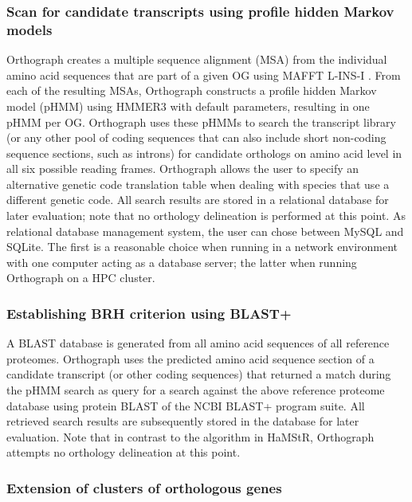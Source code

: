 \subsubsection{Scan for candidate transcripts using profile hidden
Markov
models}

Orthograph creates a multiple sequence alignment (MSA) from the
individual amino acid sequences that are part of a given OG using MAFFT
L-INS-I \citep{Katoh2013}. From each of the resulting MSAs, Orthograph
constructs a profile hidden Markov model (pHMM) using HMMER3 with
default parameters, resulting in one pHMM per OG. Orthograph uses these
pHMMs to search the transcript library (or any other pool of coding
sequences that can also include short non-coding sequence sections, such
as introns) for candidate orthologs on amino acid level in all six
possible reading frames. Orthograph allows the user to specify an
alternative genetic code translation table when dealing with species
that use a different genetic code. All search results are stored in a
relational database for later evaluation; note that no orthology
delineation is performed at this point. As relational database
management system, the user can chose between MySQL and SQLite. The
first is a reasonable choice when running in a network environment with
one computer acting as a database server; the latter when running
Orthograph on a HPC cluster.

\subsubsection{Establishing BRH criterion using
BLAST+}

A BLAST database is generated from all amino acid sequences of all
reference proteomes. Orthograph uses the predicted amino acid sequence
section of a candidate transcript (or other coding sequences) that
returned a match during the pHMM search as query for a search against
the above reference proteome database using protein BLAST of the NCBI
BLAST+ program suite. All retrieved search results are subsequently
stored in the database for later evaluation. Note that in contrast to
the algorithm in HaMStR, Orthograph attempts no orthology delineation at
this point.

\subsubsection{Extension of clusters of orthologous
genes}

